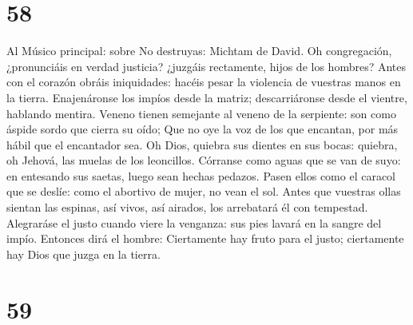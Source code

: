 \hypertarget{section-57}{%
\section{58}\label{section-57}}

 Al Músico principal: sobre No destruyas: Michtam de
David. Oh congregación, ¿pronunciáis en verdad justicia? ¿juzgáis
rectamente, hijos de los hombres?  Antes con el corazón
obráis iniquidades: hacéis pesar la violencia de vuestras manos en la
tierra.  Enajenáronse los impíos desde la matriz;
descarriáronse desde el vientre, hablando mentira.  Veneno
tienen semejante al veneno de la serpiente: son como áspide sordo que
cierra su oído;  Que no oye la voz de los que encantan,
por más hábil que el encantador sea.  Oh Dios, quiebra sus
dientes en sus bocas: quiebra, oh Jehová, las muelas de los leoncillos.
 Córranse como aguas que se van de suyo: en entesando sus
saetas, luego sean hechas pedazos.  Pasen ellos como el
caracol que se deslíe: como el abortivo de mujer, no vean el sol.
 Antes que vuestras ollas sientan las espinas, así vivos,
así airados, los arrebatará él con tempestad.  Alegraráse
el justo cuando viere la venganza: sus pies lavará en la sangre del
impío.  Entonces dirá el hombre: Ciertamente hay fruto
para el justo; ciertamente hay Dios que juzga en la tierra.

\hypertarget{section-58}{%
\section{59}\label{section-58}}

